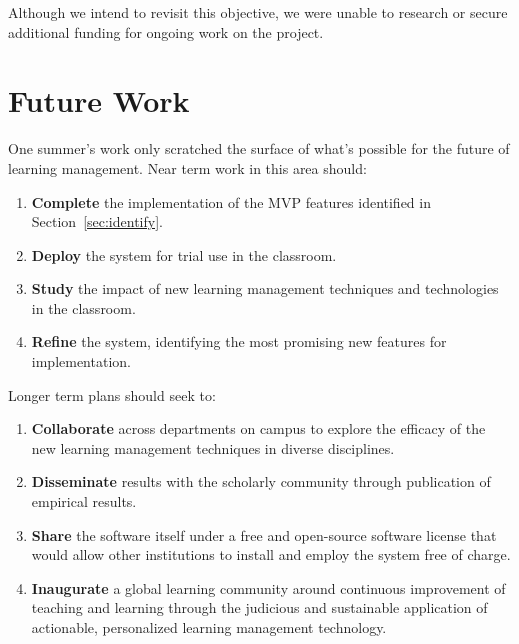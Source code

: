 \documentclass{article}
\begin{document}
Although we intend to revisit this objective,
we were unable to research or secure
additional funding for ongoing work on the project.

\section{Future Work}

One summer's work only scratched the surface of what's
possible for the future of learning management.
Near term work in this area should:
\begin{enumerate}
\item \textbf{Complete} the implementation of the MVP features
  identified in Section~\ref{sec:identify}.
\item \textbf{Deploy} the system for trial use in the classroom.
\item \textbf{Study} the impact of new learning management
  techniques and technologies in the classroom.
\item \textbf{Refine} the system,
  identifying the most promising new features
  for implementation.
\end{enumerate}
Longer term plans should seek to:
\begin{enumerate}
\item \textbf{Collaborate}
  across departments on campus
  to explore the efficacy of the new learning management techniques
  in diverse disciplines.
\item \textbf{Disseminate} results
  with the scholarly community
  through publication of empirical results.
\item \textbf{Share} the software itself
  under a free and open-source software license that would
  allow other institutions to install and employ the
  system free of charge.
\item \textbf{Inaugurate}
  a global learning community around
  continuous improvement of
  teaching and learning
  through the judicious and sustainable application
  of actionable, personalized learning management technology.
\end{enumerate}
\end{document}
